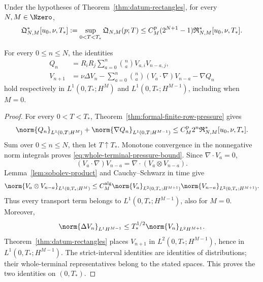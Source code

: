 \begin{proposition}
\label{prop:rectangle-pressure-completion}
Under the hypotheses of Theorem~\ref{thm:datum-rectangles}, for every
\(N,M\in\Nzero\),
\begin{equation}
 \mathfrak Q_{N,M}^*[u_0,\nu,T_*]
 :=\sup_{0<T<T_*}\mathfrak Q_{N,M}(p;T)
 \le
 C_M^{\rm p}(2^{N+1}-1)\mathfrak R_{N,M}^*[u_0,\nu,T_*].
 \label{eq:whole-terminal-pressure-bound}
\end{equation}
\begin{samepage}
For every \(0\le n\le N\), the identities
\begin{align}
 Q_n
 &=R_iR_j\sum_{a=0}^n\binom naV_{a,i}V_{n-a,j},
 \label{eq:rectangle-pressure-identity}\\
 V_{n+1}
 &=\nu\Delta V_n
 -\sum_{a=0}^n\binom na(V_a\cdot\nabla)V_{n-a}-\nabla Q_n
 \label{eq:rectangle-velocity-identity}
\end{align}
hold respectively in
\(L^1(0,T_*;H^M)\) and \(L^1(0,T_*;H^{M-1})\), including when
\(M=0\).
\end{samepage}
\end{proposition}

\begin{proof}
For every \(0<T<T_*\),
Theorem~\ref{thm:formal-finite-row-pressure} gives
\[
 \norm{Q_n}_{L^1(0,T;H^M)}
 +\norm{\nabla Q_n}_{L^1(0,T;H^{M-1})}
 \le C_M^{\rm p}2^n\mathfrak R_{N,M}^*[u_0,\nu,T_*].
\]
Sum over \(0\le n\le N\), then let \(T\uparrow T_*\).  Monotone
convergence in the nonnegative norm integrals proves
\eqref{eq:whole-terminal-pressure-bound}.  Since
\(\nabla\cdot V_a=0\),
\[
 (V_a\cdot\nabla)V_{n-a}
 =\nabla\cdot(V_a\otimes V_{n-a}).
\]
Lemma~\ref{lem:sobolev-product} and Cauchy--Schwarz in time give
\[
 \norm{V_a\otimes V_{n-a}}_{L^1(0,T_*;H^M)}
 \le C_M^{\rm alg}
 \norm{V_a}_{L^2(0,T_*;H^{M+1})}
 \norm{V_{n-a}}_{L^2(0,T_*;H^{M+1})}.
\]
Thus every transport term belongs to
\(L^1(0,T_*;H^{M-1})\), also for \(M=0\).  Moreover,
\[
 \norm{\Delta V_n}_{L^1H^{M-1}}
 \le T_*^{1/2}\norm{V_n}_{L^2H^{M+1}}.
\]
Theorem~\ref{thm:datum-rectangles} places \(V_{n+1}\) in
\(L^2(0,T_*;H^{M-1})\), hence in \(L^1(0,T_*;H^{M-1})\).
The strict-interval identities are identities of distributions; their
whole-terminal representatives belong to the stated spaces.  This proves the
two identities on \((0,T_*)\).
\end{proof}

